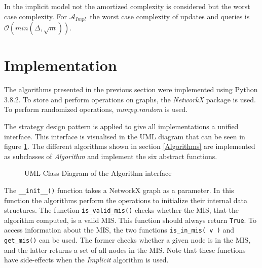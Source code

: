 \documentclass[letterpaper,11pt]{article}
\newcommand{\implicit}{$\mathcal{A}_{Impl}$\ }
\begin{document}
In the implicit model not the amortized complexity is considered but the worst
case complexity. For \implicit the worst case complexity of updates and
queries is $\mathcal{O}(min(\Delta, \sqrt{m}))$.





\section{Implementation}
\label{Implementation}

The algorithms presented in the previous section were implemented using Python
3.8.2. To store and perform operations on graphs, the \textit{NetworkX} package
is used. To perform randomized operations, \textit{numpy.random} is used.

The strategy design pattern is applied to give all implementations a unified
interface. This interface is visualised in the UML diagram that can be seen in
figure \ref{fig:uml}.
The different algorithms shown in section \ref{Algorithms} are implemented
as subclasses of \textit{Algorithm} and implement the six abstract functions.

%
%

\begin{figure}[H]
  \begin{center}
  \end{center}
  \label{fig:uml}
  \caption{UML Class Diagram of the Algorithm interface}
\end{figure}

The \lstinline[]{__init__()} function takes a NetworkX graph as a parameter. In
this function the algorithms perform the operations to initialize their internal
data structures. The function \lstinline{is_valid_mis()} checks whether the MIS,
that the algorithm computed, is a valid MIS. This function should always return
\lstinline{True}. To access information about the MIS, the two functions
\lstinline{is_in_mis( v )} and \lstinline{get_mis()} can be used. The former
checks whether a given node is in the MIS, and the latter returns a set of all
nodes in the MIS. Note that these functions have side-effects when the
\textit{Implicit} algorithm is used.
\end{document}
